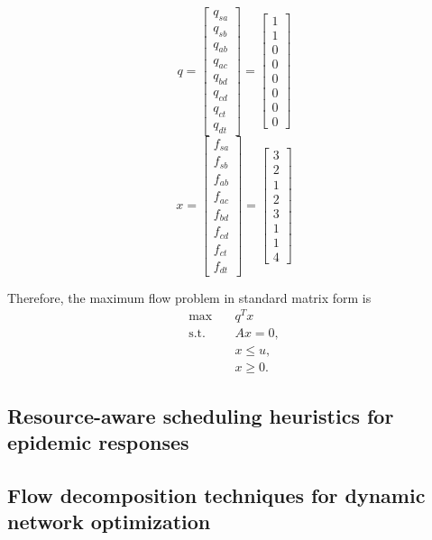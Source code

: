 \[
q=
\begin{bmatrix}
q_{sa} \\
q_{sb} \\
q_{ab} \\
q_{ac} \\
q_{bd} \\
q_{cd} \\
q_{ct} \\
q_{dt}
\end{bmatrix}
=
\begin{bmatrix}
1\\
1\\
0\\
0\\
0\\
0\\
0\\
0
\end{bmatrix}
\]
\[
x=
\begin{bmatrix}
f_{sa} \\
f_{sb} \\
f_{ab} \\
f_{ac} \\
f_{bd} \\
f_{cd} \\
f_{ct} \\
f_{dt}
\end{bmatrix}
=
\begin{bmatrix}
3\\
2\\
1\\
2\\
3\\
1\\
1\\
4
\end{bmatrix}
\]

Therefore, the maximum flow problem in standard matrix form is
\[
\begin{aligned}
\max \quad & q^T x \\
\text{s.t.} \quad & Ax = 0, \\
& x \le u, \\
& x \ge 0.
\end{aligned}
\]

\subsection{Resource-aware scheduling heuristics for epidemic responses}

\subsection{Flow decomposition techniques for dynamic network optimization}